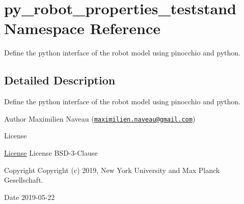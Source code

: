 \hypertarget{namespacepy__robot__properties__teststand}{}\section{py\+\_\+robot\+\_\+properties\+\_\+teststand Namespace Reference}
\label{namespacepy__robot__properties__teststand}


Define the python interface of the robot model using pinocchio and python.  




\subsection{Detailed Description}
Define the python interface of the robot model using pinocchio and python. 

\begin{DoxyAuthor}{Author}
Maximilien Naveau (\href{mailto:maximilien.naveau@gmail.com}{\tt maximilien.\+naveau@gmail.\+com}) 
\end{DoxyAuthor}
\begin{DoxyRefDesc}{License}
\item[\hyperlink{license__license000002}{License}]License B\+S\+D-\/3-\/\+Clause \end{DoxyRefDesc}
\begin{DoxyCopyright}{Copyright}
Copyright (c) 2019, New York University and Max Planck Gesellschaft. 
\end{DoxyCopyright}
\begin{DoxyDate}{Date}
2019-\/05-\/22 
\end{DoxyDate}
